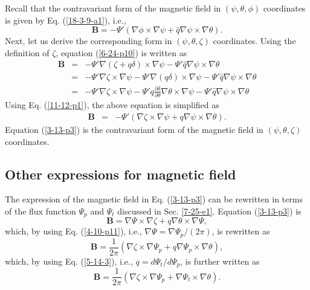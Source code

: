 \documentclass{article}
\begin{document}
Recall that the contravariant form of the magnetic field in $(\psi, \theta,
\phi)$ coordinates is given by Eq. (\ref{18-3-9-a1}), i.e.,
\begin{equation}
  \label{6-24-p10} \mathbf{B}= - \Psi' (\nabla \phi \times \nabla \psi +
  \hat{q} \nabla \psi \times \nabla \theta) .
\end{equation}
Next, let us derive the corresponding form in $(\psi, \theta, \zeta)$
coordinates. Using the definition of $\zeta$, equation (\ref{6-24-p10}) is
written as
\begin{eqnarray}
  \mathbf{B} & = & - \Psi' \nabla (\zeta + q \delta) \times \nabla \psi -
  \Psi' \hat{q} \nabla \psi \times \nabla \theta \nonumber\\
  & = & - \Psi' \nabla \zeta \times \nabla \psi - \Psi' \nabla (q \delta)
  \times \nabla \psi - \Psi' \hat{q} \nabla \psi \times \nabla \theta
  \nonumber\\
  & = & - \Psi' \nabla \zeta \times \nabla \psi - \Psi' q \frac{\partial
  \delta}{\partial \theta} \nabla \theta \times \nabla \psi - \Psi' \hat{q}
  \nabla \psi \times \nabla \theta 
\end{eqnarray}
Using Eq. (\ref{11-12-p1}), the above equation is simplified as
\begin{eqnarray}
  \label{18-8-22-p1} \mathbf{B} & = & - \Psi' (\nabla \zeta \times \nabla \psi
  + q \nabla \psi \times \nabla \theta) .  \label{3-13-p3}
\end{eqnarray}
Equation (\ref{3-13-p3}) is the contravariant form of the magnetic field in
$(\psi, \theta, \zeta)$ coordinates.

\subsection{Other expressions for magnetic field}

The expression of the magnetic field in Eq. (\ref{3-13-p3}) can be rewritten
in terms of the flux function $\Psi_p$ and $\Psi_t$ discussed in Sec.
\ref{7-25-e1}. Equation (\ref{3-13-p3}) is
\begin{equation}
  \label{3-20-a2} \mathbf{B}= \nabla \Psi \times \nabla \zeta + q \nabla
  \theta \times \nabla \Psi,
\end{equation}
which, by using Eq. (\ref{4-10-p11}), i.e., $\nabla \Psi = \nabla \Psi_p / (2
\pi)$, is rewritten as
\begin{equation}
  \label{4-10-p8} \mathbf{B}= \frac{1}{2 \pi} (\nabla \zeta \times \nabla
  \Psi_p + q \nabla \Psi_p \times \nabla \theta),
\end{equation}
which, by using Eq. (\ref{5-14-3}), i.e., $q = d \Psi_t / d \Psi_p$, is
further written as
\begin{equation}
  \label{6-30-e1} \mathbf{B}= \frac{1}{2 \pi} (\nabla \zeta \times \nabla
  \Psi_p + \nabla \Psi_t \times \nabla \theta) .
\end{equation}
\end{document}

